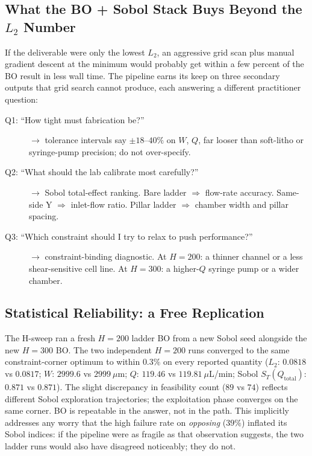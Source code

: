 \documentclass[12pt]{article}
\begin{document}
\subsection{What the BO + Sobol Stack Buys Beyond the $L_2$ Number}
If the deliverable were only the lowest $L_2$, an aggressive grid scan plus manual gradient descent at the minimum would probably get within a few percent of the BO result in less wall time. The pipeline earns its keep on three secondary outputs that grid search cannot produce, each answering a different practitioner question:
\begin{description}
\item[Q1: ``How tight must fabrication be?''] $\to$ tolerance intervals say $\pm 18$--$40\%$ on $W$, $Q$, far looser than soft-litho or syringe-pump precision; do not over-specify.
\item[Q2: ``What should the lab calibrate most carefully?''] $\to$ Sobol total-effect ranking. Bare ladder $\Rightarrow$ flow-rate accuracy. Same-side Y $\Rightarrow$ inlet-flow ratio. Pillar ladder $\Rightarrow$ chamber width and pillar spacing.
\item[Q3: ``Which constraint should I try to relax to push performance?''] $\to$ constraint-binding diagnostic. At $H = 200$: a thinner channel or a less shear-sensitive cell line. At $H = 300$: a higher-$Q$ syringe pump or a wider chamber.
\end{description}

\subsection{Statistical Reliability: a Free Replication}
The H-sweep ran a fresh $H = 200$ ladder BO from a new Sobol seed alongside the new $H = 300$ BO. The two independent $H = 200$ runs converged to the same constraint-corner optimum to within $0.3\%$ on every reported quantity ($L_2$: $0.0818$ vs $0.0817$; $W$: $2999.6$ vs $2999~\mu$m; $Q$: $119.46$ vs $119.81~\mu$L/min; Sobol $S_T(Q_{\text{total}})$: $0.871$ vs $0.871$). The slight discrepancy in feasibility count ($89$ vs $74$) reflects different Sobol exploration trajectories; the exploitation phase converges on the same corner. BO is repeatable in the answer, not in the path. This implicitly addresses any worry that the high failure rate on \emph{opposing} ($39\%$) inflated its Sobol indices: if the pipeline were as fragile as that observation suggests, the two ladder runs would also have disagreed noticeably; they do not.
\end{document}
